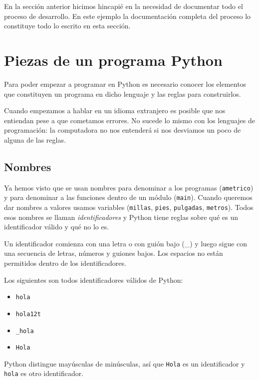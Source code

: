 En la sección anterior hicimos hincapié en la necesidad de
documentar todo el proceso de desarrollo. En este ejemplo la
documentación completa del proceso lo constituye todo lo escrito
en esta sección.

\section {Piezas de un programa Python}
Para poder empezar a programar en Python es necesario conocer los elementos
que constituyen un programa en dicho lenguaje y las reglas para construirlos.

\begin{observacion}
Cuando empezamos a hablar en un idioma extranjero es posible que nos entiendan
pese a que cometamos errores. No sucede lo mismo con los lenguajes de
programación: la computadora no nos entenderá si nos desviamos un poco de
alguna de las reglas.
\end{observacion}

\subsection{Nombres}
Ya hemos visto que se usan nombres para denominar a los programas
(\lstinline!ametrico!) y para denominar a las funciones dentro de un
módulo (\lstinline!main!). Cuando queremos dar nombres a valores usamos
variables (\lstinline!millas!, \lstinline!pies!, \lstinline!pulgadas!,
\lstinline!metros!). Todos esos nombres se llaman \emph{identificadores}
y Python tiene reglas sobre qué es un identificador válido y qué
no lo es.

Un identificador comienza con una letra o con guión bajo (\_) y
luego sigue con una secuencia de letras, números y guiones bajos.
Los espacios no están permitidos dentro de los identificadores.

Los siguientes son todos identificadores válidos de Python:

\begin{itemize}
\item \lstinline!hola!
\item \lstinline!hola12t!
\item \lstinline!_hola!
\item \lstinline!Hola!
\end{itemize}

Python distingue mayúsculas de minúsculas, así que \lstinline!Hola! es
un identificador y \lstinline!hola! es otro identificador.

